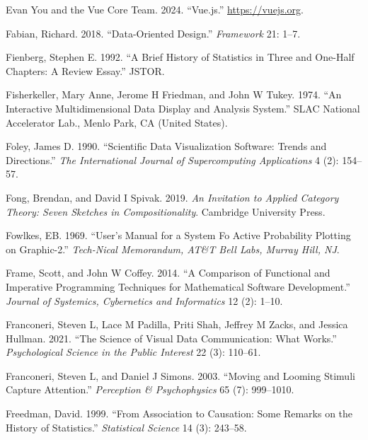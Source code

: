 \documentclass[
]{book}
\newlength{\cslhangindent}
\newenvironment{CSLReferences}[2] %
 {\begin{list}{}{%
  \setlength{\itemindent}{0pt}
  \setlength{\leftmargin}{0pt}
  \setlength{\parsep}{0pt}
  \ifodd #1
   \setlength{\leftmargin}{\cslhangindent}
   \setlength{\itemindent}{-1\cslhangindent}
  \fi
  \setlength{\itemsep}{#2\baselineskip}}}
 {\end{list}}
\theoremstyle{definition}
\theoremstyle{definition}
\theoremstyle{definition}
\theoremstyle{definition}
\theoremstyle{remark}
\begin{document}
\begin{CSLReferences}{1}{0}
Evan You and the Vue Core Team. 2024. {``Vue.js.''} \url{https://vuejs.org}.

Fabian, Richard. 2018. {``Data-Oriented Design.''} \emph{Framework} 21: 1--7.

Fienberg, Stephen E. 1992. {``A Brief History of Statistics in Three and One-Half Chapters: A Review Essay.''} JSTOR.

Fisherkeller, Mary Anne, Jerome H Friedman, and John W Tukey. 1974. {``An Interactive Multidimensional Data Display and Analysis System.''} SLAC National Accelerator Lab., Menlo Park, CA (United States).

Foley, James D. 1990. {``Scientific Data Visualization Software: Trends and Directions.''} \emph{The International Journal of Supercomputing Applications} 4 (2): 154--57.

Fong, Brendan, and David I Spivak. 2019. \emph{An Invitation to Applied Category Theory: Seven Sketches in Compositionality}. Cambridge University Press.

Fowlkes, EB. 1969. {``User's Manual for a System Fo Active Probability Plotting on Graphic-2.''} \emph{Tech-Nical Memorandum, AT\&T Bell Labs, Murray Hill, NJ}.

Frame, Scott, and John W Coffey. 2014. {``A Comparison of Functional and Imperative Programming Techniques for Mathematical Software Development.''} \emph{Journal of Systemics, Cybernetics and Informatics} 12 (2): 1--10.

Franconeri, Steven L, Lace M Padilla, Priti Shah, Jeffrey M Zacks, and Jessica Hullman. 2021. {``The Science of Visual Data Communication: What Works.''} \emph{Psychological Science in the Public Interest} 22 (3): 110--61.

Franconeri, Steven L, and Daniel J Simons. 2003. {``Moving and Looming Stimuli Capture Attention.''} \emph{Perception \& Psychophysics} 65 (7): 999--1010.

Freedman, David. 1999. {``From Association to Causation: Some Remarks on the History of Statistics.''} \emph{Statistical Science} 14 (3): 243--58.


\end{CSLReferences}
\end{document}
